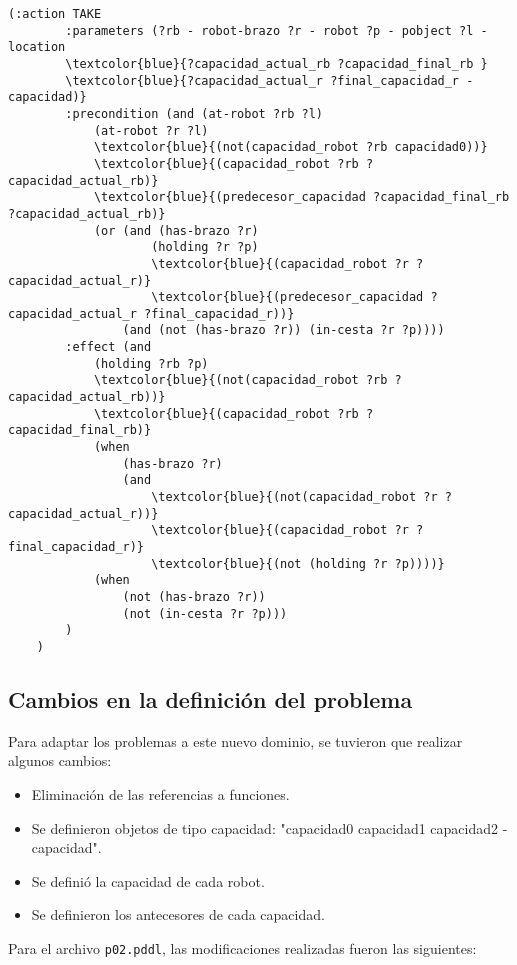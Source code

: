 \documentclass{article}
\begin{document}
\begin{Verbatim}[commandchars=\\\{\}]
    (:action TAKE
        :parameters (?rb - robot-brazo ?r - robot ?p - pobject ?l - location 
        \textcolor{blue}{?capacidad_actual_rb ?capacidad_final_rb }
        \textcolor{blue}{?capacidad_actual_r ?final_capacidad_r - capacidad)}
        :precondition (and (at-robot ?rb ?l)
            (at-robot ?r ?l)
            \textcolor{blue}{(not(capacidad_robot ?rb capacidad0))}
            \textcolor{blue}{(capacidad_robot ?rb ?capacidad_actual_rb)}
            \textcolor{blue}{(predecesor_capacidad ?capacidad_final_rb ?capacidad_actual_rb)}
            (or (and (has-brazo ?r)
                    (holding ?r ?p)
                    \textcolor{blue}{(capacidad_robot ?r ?capacidad_actual_r)}
                    \textcolor{blue}{(predecesor_capacidad ?capacidad_actual_r ?final_capacidad_r))}
                (and (not (has-brazo ?r)) (in-cesta ?r ?p))))
        :effect (and
            (holding ?rb ?p)
            \textcolor{blue}{(not(capacidad_robot ?rb ?capacidad_actual_rb))}
            \textcolor{blue}{(capacidad_robot ?rb ?capacidad_final_rb)}
            (when
                (has-brazo ?r)
                (and
                    \textcolor{blue}{(not(capacidad_robot ?r ?capacidad_actual_r))}
                    \textcolor{blue}{(capacidad_robot ?r ?final_capacidad_r)}
                    \textcolor{blue}{(not (holding ?r ?p))))}
            (when
                (not (has-brazo ?r))
                (not (in-cesta ?r ?p)))
        )
    )
\end{Verbatim}

\subsection{Cambios en la definición del problema}
Para adaptar los problemas a este nuevo dominio, se tuvieron que realizar algunos cambios:
\begin{itemize}
    \item Eliminación de las referencias a funciones.
    \item Se definieron objetos de tipo capacidad: "capacidad0 capacidad1 capacidad2 - capacidad".
    \item Se definió la capacidad de cada robot.
    \item Se definieron los antecesores de cada capacidad.
\end{itemize}

Para el archivo \texttt{p02.pddl}, las modificaciones realizadas fueron las siguientes:
\end{document}
